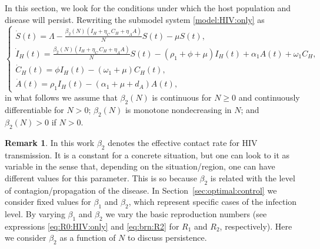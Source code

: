 \documentclass{my_aims}
\theoremstyle{definition}
\newtheorem{remark}{Remark}
\begin{document}
In this section, we look for the conditions under which the host population
and disease will persist. Rewriting the submodel system \eqref{model:HIV:only} as
\begin{equation}
\label{mod:HIV:beta2N}
\begin{cases}
\dot{S}(t) = \Lambda - \frac{\beta_2(N) \left( I_H + \eta_C \, C_H
+ \eta_A A  \right)}{N} S(t) - \mu S(t),\\[0.2 cm]
\dot{I}_H(t) = \frac{\beta_2(N) \left( I_H + \eta_C \, C_H
+ \eta_A A  \right)}{N} S(t) - (\rho_1 + \phi + \mu)I_H(t)
 + \alpha_1 A(t)  + \omega_1 C_H, \\[0.2 cm]
\dot{C}_H(t) = \phi I_H(t) - (\omega_1 + \mu)C_H(t),\\[0.2 cm]
\dot{A}(t) =  \rho_1 I_H(t) - (\alpha_1 + \mu + d_A) A(t),
\end{cases}
\end{equation}
in what follows we assume that $\beta_2 (N)$ is continuous for $N \geq 0$
and continuously differentiable for $N > 0$; $\beta_2(N)$
is monotone nondecreasing in $N$; and $\beta_2(N) > 0$ if $N > 0$.

\begin{remark}
In this work $\beta_2$ denotes the effective contact rate for HIV transmission.
It is a constant for a concrete situation, but one can look to it
as variable in the sense that, depending on the situation/region,
one can have different values for this parameter. This is so because
$\beta_2$ is related with the level of contagion/propagation of the disease.
In Section~\ref{sec:optimal:control} we consider fixed values for $\beta_1$ and $\beta_2$,
which represent specific cases of the infection level.
By varying $\beta_1$ and $\beta_2$ we vary
the basic reproduction numbers (see expressions
\eqref{eq:R0:HIV:only} and \eqref{eq:brn:R2}
for $R_1$ and $R_2$, respectively).
Here we consider $\beta_2$ as a function of $N$
to discuss persistence.
\end{remark}
\end{document}
